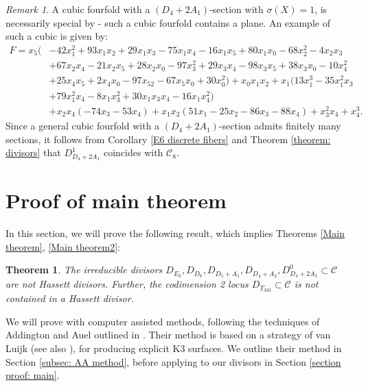 \documentclass[12pt]{amsart}
\numberwithin{equation}{section}
\theoremstyle{plain}
\newtheorem{theorem}[equation]{Theorem}
\theoremstyle{remark}
\newtheorem{remark}[equation]{Remark}
\theoremstyle{definition}
\newcommand{\calC}{\mathcal{C}}
\newcommand{\defect}{\sigma(X)}
\begin{document}
\begin{remark}
    A cubic fourfold with a $(D_4+2A_1)$-section with $\defect=1$, is necessarily special by \cite[Theorem 1.5]{MV25} - such a cubic fourfold contains a plane. An example of such a cubic is given by:
    \begin{equation}\label{ex: D4+2A1 with defect}
\begin{split}
    F= x_5(&- 42x_1^2+ 93x_1x_2+ 29x_1x_3 - 75x_1x_4 - 16x_1x_5 + 80x_1x_0 - 68x_2^2- 4x_2x_3\\
    &+ 67x_2x_4 - 21x_2x_5 + 28x_2x_0 - 
    97x_3^2 + 29x_3x_4 - 98x_3x_5 + 38x_3x_0- 10x_4^2 \\
    &+ 25x_4x_5 + 2x_4x_0 - 97x_52 - 67x_5x_0 + 30x_0^2)+x_0x_1x_2+x_1(13x_1^3- 35x_1^2x_3 \\
    &+ 79x_1^2x_4- 8x_1x_3^2 + 30x_1x_3x_4 
    - 16x_1x_4^2)\\
    &+x_2x_4(- 74x_3  - 53x_4)+x_1x_2(51x_1- 25x_2- 86x_3 - 88x_4)   + x_3^2x_4  + x_4^3. 
\end{split}
\end{equation}
Since a general cubic fourfold with a $(D_4+2A_1)$-section admits finitely many sections, it follows from Corollary \ref{E6 discrete fibers} and Theorem \ref{theorem: divisors} that $D_{D_4+2A_1}^1$ coincides with $\calC_{8}.$
\end{remark}

\section{Proof of main theorem}\label{sec: non Hassett}

In this section, we will prove the following result, which implies Theorems \ref{Main theorem}, \ref{Main theorem2}:
\begin{theorem}\label{theorem: main}
    The irreducible divisors $D_{E_6}, D_{D_6}, D_{D_5+A_1},D_{D_4+A_2},D_{D_4+2A_1}^0\subset \calC$ are not Hassett divisors. Further, the codimension 2 locus $D_{T_{333}}\subset \calC$ is not contained in a Hassett divisor.
\end{theorem}

We will prove  with computer assisted methods, following the techniques of Addington and Auel outlined in \cite{AA}. Their method is based on a strategy of van Luijk \cite{vanLuijik} (see also \cite{EJ1, EJ2}), for producing explicit K3 surfaces. We outline their method in Section \ref{subsec: AA method}, before applying to our divisors in Section \ref{section proof: main}. 
\end{document}
